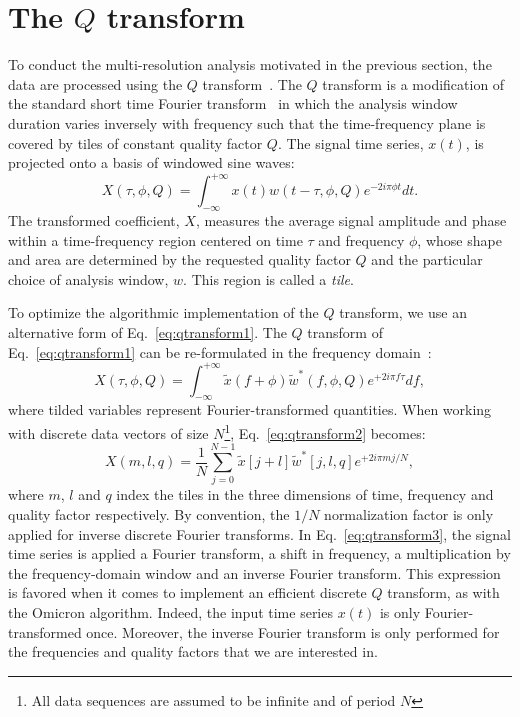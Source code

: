 \section{The $Q$ transform} \label{sec:qtransform}
To conduct the multi-resolution analysis motivated in the previous section, the data are processed using the $Q$ transform~\cite{Brown:1991}. The $Q$ transform is a modification of the standard short time Fourier transform~\cite{Gabor:1946} in which the analysis window duration varies inversely with frequency such that the time-frequency plane is covered by tiles of constant quality factor $Q$. The signal time series, $x(t)$, is projected onto a basis of windowed sine waves:
\begin{equation}
  X(\tau, \phi, Q) = \int_{-\infty}^{+\infty}{ x(t) w(t-\tau,\phi,Q) e^{-2i\pi\phi t}dt}.
  \label{eq:qtransform1}
\end{equation}
The transformed coefficient, $X$, measures the average signal amplitude and phase within a time-frequency region centered on time $\tau$ and frequency $\phi$, whose shape and area are determined by the requested quality factor $Q$ and the particular choice of analysis window, $w$. This region is called a \textit{tile}.

To optimize the algorithmic implementation of the $Q$ transform, we use an alternative form of Eq.~\ref{eq:qtransform1}. The $Q$ transform of Eq.~\ref{eq:qtransform1} can be re-formulated in the frequency domain~\cite{Chatterji:2004}:
\begin{equation}
  X(\tau, \phi, Q) = \int_{-\infty}^{+\infty}{ \tilde{x}(f+\phi) \tilde{w}^{*}(f,\phi,Q) e^{+2i\pi f \tau}df},
  \label{eq:qtransform2}
\end{equation}
where tilded variables represent Fourier-transformed quantities. When working with discrete data vectors of size $N$\footnote{All data sequences are assumed to be infinite and of period $N$}, Eq.~\ref{eq:qtransform2} becomes:
\begin{equation}
  X(m,l,q) = \frac{1}{N}\sum_{j=0}^{N-1}{\tilde{x}[j+l]\tilde{w}^{*}[j,l,q]e^{+2i\pi mj/N}},
  \label{eq:qtransform3}
\end{equation}
where $m$, $l$ and $q$ index the tiles in the three dimensions of time, frequency and quality factor respectively. By convention, the $1/N$ normalization factor is only applied for inverse discrete Fourier transforms. In Eq.~\ref{eq:qtransform3}, the signal time series is applied a Fourier transform, a shift in frequency, a multiplication by the frequency-domain window and an inverse Fourier transform. This expression is favored when it comes to implement an efficient discrete $Q$ transform, as with the Omicron algorithm. Indeed, the input time series $x(t)$ is only Fourier-transformed once. Moreover, the inverse Fourier transform is only performed for the frequencies and quality factors that we are interested in.

